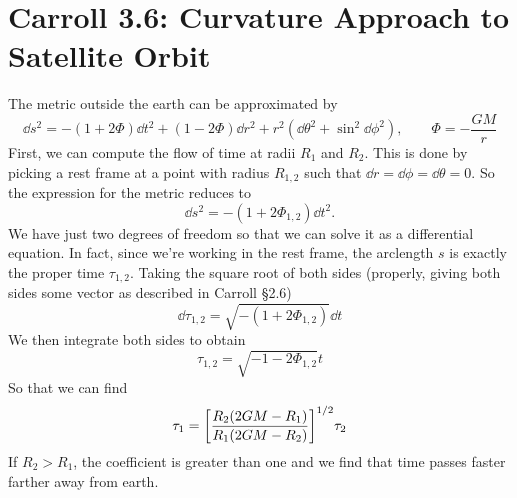 \documentclass{report}
\begin{document}
\section{Carroll 3.6: Curvature Approach to Satellite Orbit}
The metric outside the earth can be approximated by 
\begin{equation*}
	\dd{s}^2 = -(1+2\Phi)\dd{t}^2 + (1-2\Phi)\dd{r}^2 
		+ r^2 (\dd{\theta}^2 + \sin^2\dd{\phi}^2), \qquad 
		\Phi = -\frac{GM}{r}
\end{equation*}
First, we can compute the flow of time at radii $ R_1 $ and $ R_2 $. This is 
done by picking a rest frame at a point with radius $ R_{1,2} $ such that 
$ \dd{r} = \dd{\phi} = \dd{\theta} = 0 $. So the expression for the metric 
reduces to 
\begin{equation*}
	\dd{s}^2 = -(1+2\Phi_{1,2})\dd{t}^2.
\end{equation*}
We have just two degrees of freedom so that we can solve it as a differential 
equation. In fact, since we're working in the rest frame, the arclength $ s $ 
is exactly the proper time $ \tau_{1,2} $. Taking the square root of both 
sides (properly, giving both sides some vector as described in Carroll \S 2.6)
\begin{equation*}
	\dd{\tau_{1,2}} = \sqrt{-(1+2\Phi_{1,2})}\dd{t}
\end{equation*}
We then integrate both sides to obtain 
\begin{equation*}
	\tau_{1,2} = \sqrt{-1-2\Phi_{1,2}} t
\end{equation*}
So that we can find 
\begin{equation*}
	\tau_{1} = \qty[ \frac{R_2(2GM - R_1)}{R_1(2GM-R_2)} ]^{1/2}\tau_2
\end{equation*}
If $ R_2>R_1 $, the coefficient is greater than one and we find that time passes 
faster farther away from earth.
\end{document}
